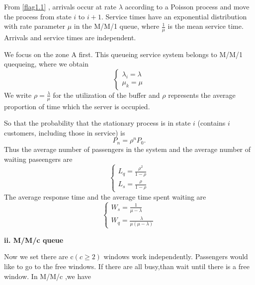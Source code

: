 \documentclass{mcmthesis}
\begin{document}
			From \ref{flag1.1} , arrivals occur at rate ${\lambda}$ according to a Poisson process and move the process from state ${i}$ to ${i + 1}$. Service times have an exponential distribution with rate parameter ${\mu}$ in the M/M/1 queue, where ${\frac{1}{\mu}}$ is the mean service time. Arrivals and service times are independent.
			
			We focus on the zone A first. This queueing service system belongs to M/M/1 quequeing, where we obtain
				\begin{equation}    
					\left  \{
       						\begin{array}{lr}
        						  \lambda_i = \lambda\\
        						  \mu_k = \mu
  					      \end{array}
					\right.
				\end{equation}
			We write ${\rho = \frac{\lambda}{\mu}}$ for the utilization of the buffer and  ${\rho}$ represents the average proportion of time which the server is occupied.
			
			So that the probability that the stationary process is in state ${i}$ (contains ${i}$ customers, including those in service) is
			\begin{equation}
			 	P_n = \rho ^n P_0.
			\end{equation}
			Thus the average number of passengers in the system and the average number of waiting paseengers are
				\begin{equation}    
					\left  \{
       						\begin{array}{lr}
			 				L_q = \frac {\rho ^2}{1-\rho}\\  \label{eq1}
							L_s = \frac{\rho}{1 - \rho}
  					      \end{array}
					\right.
				\end{equation}
			The average response time and the average time spent waiting are
				\begin{equation}    
					\left  \{
       						\begin{array}{lr}
       							W_s = \frac{1}{\mu - \lambda}\\   \label{eq2}
       							W_q = \frac{\lambda}{\mu (\mu - \lambda)}
  					      \end{array}
					\right.
				\end{equation}

	\par{\bf ii. M/M/c queue }%
\par Now we set there are c$(c\geqslant 2)$ windows work independently. Passengers would like  to go to the free windows. If there are all busy,than wait until there is a free window.
In M/M/c ,we have 
 
\end{document}
